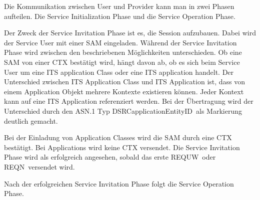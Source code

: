 Die Kommunikation zwischen User und Provider kann man in zwei Phasen aufteilen. Die Service Initialization Phase und die Service Operation Phase.

Der Zweck der Service Invitation Phase ist es, die Session aufzubauen. Dabei wird der Service User mit einer \ac{SAM} eingeladen. Während der Service Invitation Phase wird zwischen den beschriebenen Möglichkeiten unterschieden. Ob eine \ac{SAM} von einer \ac{CTX} bestätigt wird, hängt davon ab, ob es sich beim Service User um eine \ac{ITS} application Class oder eine \ac{ITS} application handelt. Der Unterschied zwischen \ac{ITS} Application Class und \ac{ITS} Application ist, dass von einem Application Objekt mehrere Kontexte existieren können. Jeder Kontext kann auf eine \ac{ITS} Application referenziert werden. Bei der Übertragung wird der Unterschied durch  den \ac{ASN.1} Typ \glqq DSRCapplicationEntityID\grqq~als Markierung deutlich gemacht. 

Bei der Einladung von Application Classes wird die \ac{SAM} durch eine \ac{CTX} bestätigt. Bei Applications wird keine \ac{CTX} versendet. Die Service Invitation Phase wird als erfolgreich angesehen, sobald das erste \glqq REQUW\grqq~oder \glqq REQN\grqq~versendet wird. 

Nach der erfolgreichen Service Invitation Phase folgt die Service Operation Phase.

